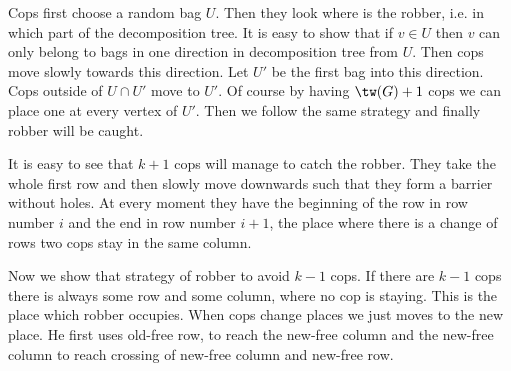 {
Cops first choose a random bag $U$. Then they look where is the robber, i.e. in which part of the decomposition tree.
It is easy to show that if $v \in U$ then $v$ can only belong to bags in one direction in decomposition tree from $U$.
Then cops move slowly towards this direction. Let $U'$ be the first bag into this direction. Cops outside of $U \cap U'$
move to $U'$. Of course by having $\tw(G) + 1$ cops we can place one at every vertex of $U'$. Then we follow the same
strategy and finally robber will be caught.
}



{
It is easy to see that $k+1$ cops will manage to catch the robber. They take the whole first row and then slowly move
downwards such that they form a barrier without holes. At every moment they have the beginning of the row in row number
$i$ and the end in row number $i+1$, the place where there is a change of rows two cops stay in the same column.

Now we show that strategy of robber to avoid $k-1$ cops. If there are $k-1$ cops there is always some row and some column,
where no cop is staying. This is the place which robber occupies. When cops change places we just moves to the new place.
He first uses old-free row, to reach the new-free column and the new-free column to reach crossing of new-free column and
new-free row.
}



